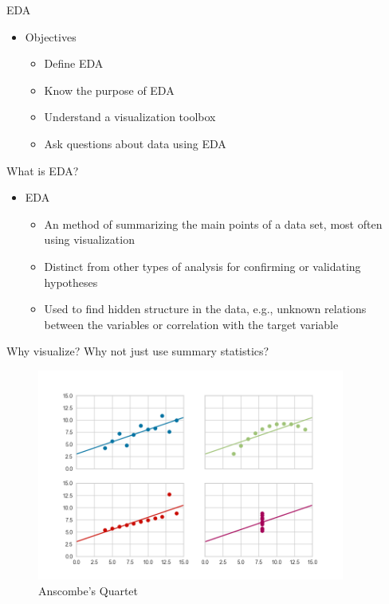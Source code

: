\documentclass[10pt]{beamer}
\begin{document}
\begin{frame}{EDA}
	\begin{itemize}
		\item Objectives
			\begin{itemize}
				\item Define EDA
				\item Know the purpose of EDA
				\item Understand a visualization toolbox
				\item Ask questions about data using EDA
			\end{itemize}
	\end{itemize}
\end{frame}

\begin{frame}{What is EDA?}  
	\begin{itemize}
		\item EDA
			\begin{itemize}
			    \pause
				\item An method of summarizing the main points of a data set, most often using visualization
				\pause
				\item Distinct from other types of analysis for confirming or validating hypotheses
				\pause
				\item Used to find hidden structure in the data, e.g., unknown relations between the variables or correlation with the target variable
			\end{itemize}
	\end{itemize}
\end{frame}

\begin{frame}{Why visualize?}
Why not just use summary statistics?
	\pause
	\begin{figure}	
		\caption{Anscombe's Quartet}
		\includegraphics[width=0.9\textwidth, center, trim=0cm 0cm 0 0cm]{images/anscombe.png}
	\end{figure}
\end{frame}
\end{document}
